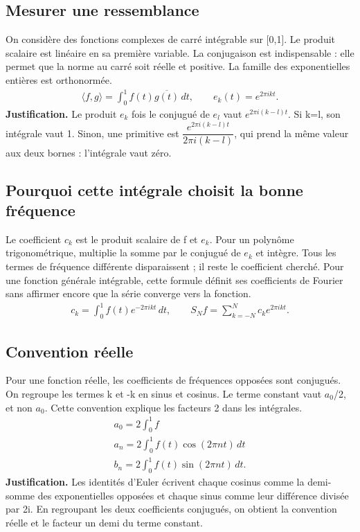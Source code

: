 \documentclass[11pt,a4paper]{article}
\begin{document}
\subsection{Mesurer une ressemblance}
On considère des fonctions complexes de carré intégrable sur [0,1]. Le produit scalaire est linéaire en sa première variable. La conjugaison est indispensable : elle permet que la norme au carré soit réelle et positive. La famille des exponentielles entières est orthonormée.
\[\begin{gathered}\langle f,g\rangle=\int_0^1 f(t)\overline{g(t)}\,dt,\qquad e_k(t)=e^{2\pi ikt}.\end{gathered}\]
\textbf{Justification.} Le produit $e_k$ fois le conjugué de $e_l$ vaut $e^{2\pi i(k-l)t}$. Si k=l, son intégrale vaut 1. Sinon, une primitive est $\dfrac{e^{2\pi i(k-l)t}}{2\pi i(k-l)}$, qui prend la même valeur aux deux bornes : l’intégrale vaut zéro.
\subsection{Pourquoi cette intégrale choisit la bonne fréquence}
Le coefficient $c_k$ est le produit scalaire de f et $e_k$. Pour un polynôme trigonométrique, multiplie la somme par le conjugué de $e_k$ et intègre. Tous les termes de fréquence différente disparaissent ; il reste le coefficient cherché. Pour une fonction générale intégrable, cette formule définit ses coefficients de Fourier sans affirmer encore que la série converge vers la fonction.
\[\begin{gathered}c_k=\int_0^1 f(t)e^{-2\pi ikt}\,dt,\qquad S_Nf=\sum_{k=-N}^{N}c_ke^{2\pi ikt}.\end{gathered}\]
\subsection{Convention réelle}
Pour une fonction réelle, les coefficients de fréquences opposées sont conjugués. On regroupe les termes k et -k en sinus et cosinus. Le terme constant vaut $a_0$/2, et non $a_0$. Cette convention explique les facteurs 2 dans les intégrales.
\[\begin{gathered}a_0=2\int_0^1 f\\ a_n=2\int_0^1 f(t)\cos(2\pi nt)\,dt\\ b_n=2\int_0^1 f(t)\sin(2\pi nt)\,dt.\end{gathered}\]
\textbf{Justification.} Les identités d’Euler écrivent chaque cosinus comme la demi-somme des exponentielles opposées et chaque sinus comme leur différence divisée par 2i. En regroupant les deux coefficients conjugués, on obtient la convention réelle et le facteur un demi du terme constant.
\end{document}
